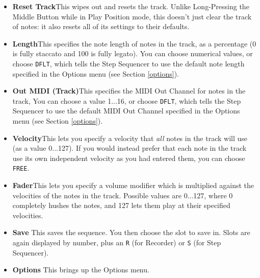 \documentclass{article}
\begin{document}
\begin{itemize}
\item {\bf Reset Track}\quad This wipes out and resets the track.  Unlike Long-Pressing the Middle Button while in Play Position mode, this doesn't just clear the track of notes: it also resets all of its settings to their defaults.
\item {\bf Length}\quad This specifies the note length of notes in the track, as a percentage (0 is fully staccato and 100 is fully legato).   You can choose numerical values, or choose \texttt{DFLT}, which tells the Step Sequencer to use the default note length specified in the Options menu (see Section \ref{options}).
\item {\bf Out MIDI (Track)}\quad This specifies the MIDI Out Channel for notes in the track,    You can choose a value 1...16, or choose \texttt{DFLT}, which tells the Step Sequencer to use the default MIDI Out Channel specified in the Options menu (see Section \ref{options}).
\item {\bf Velocity}\quad This lets you specify a velocity that {\it all} notes in the track will use (as a value 0...127).  If you would instead prefer that each note in the track use its own independent velocity as you had entered them, you can choose \texttt{FREE}.
\item {\bf Fader}\quad This lets you specify a volume modifier which is multiplied against the velocities of the notes in the track.  Possible values are 0...127, where 0 completely hushes the notes, and 127 lets them play at their specified velocities. 

\item {\bf Save} \quad This saves the sequence. You then choose the slot to save in.  Slots are again displayed by number, plus an \texttt{R} (for Recorder) or \texttt{S} (for Step Sequencer).
\item {\bf Options} \quad This brings up the Options menu.
\end{itemize}
\end{document}
